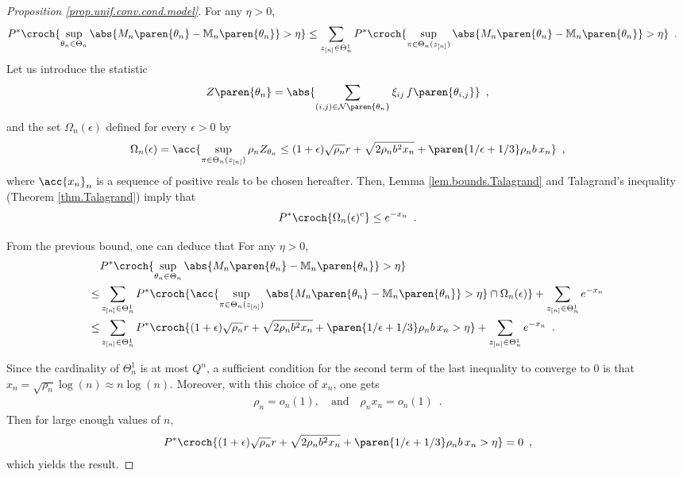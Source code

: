 \documentclass[11pt]{article}
\newtheorem{proof}{Proof}%
\newcommand{\zn}{z_{[n]}}
\begin{document}
\begin{proof}[Proposition \ref{prop.unif.conv.cond.model}]
For any $\eta>0$,
\begin{align*}           P^*\croch{\sup_{\theta_n\in\Theta_n}\abs{M_n\paren{\theta_n}-\mathbb{M}_n\paren{\theta_n}}>\eta} &  \leq \sum_{\zn\in\Theta_n^1} P^*\croch{\sup_{\pi\in\Theta_n(\zn)}\abs{M_n\paren{\theta_n}-\mathbb{M}_n\paren{\theta_n}}>\eta} \enspace.
\end{align*}
%
Let us introduce the statistic
\begin{align*}
Z\paren{\theta_n}=\abs{\sum_{(i, j)\in\mathcal{N}\paren{\theta_n}} \xi_{ij}\, f\paren{\theta_{i,j}}}\enspace,   
\end{align*}
and the set $\Omega_n(\epsilon)$ defined for every $\epsilon>0$ by
\begin{align*}
\Omega_n(\epsilon) = \acc{ \sup_{\pi\in\Theta_n(\zn)} \rho_n Z_{\theta_n} \leq (1+\epsilon) \sqrt{\rho_n} r + \sqrt{2 \rho_n b^2 x_n}+ \paren{1/\epsilon+1/3} \rho_n b\, x_n}\enspace,
\end{align*}
where $\acc{x_n}_n$ is a sequence of positive reals to be chosen hereafter.
%
Then, Lemma \ref{lem.bounds.Talagrand} and Talagrand's inequality (Theorem \ref{thm.Talagrand}) imply that
\begin{align*}
        P^*\croch{\Omega_n(\epsilon)^c}\leq e^{-x_n}\enspace.
\end{align*}

From the previous bound, one can deduce that
For any $\eta>0$,
\begin{align*}           & P^*\croch{\sup_{\theta_n\in\Theta_n}\abs{M_n\paren{\theta_n}-\mathbb{M}_n\paren{\theta_n}}>\eta}\\
\leq & \sum_{\zn\in\Theta_n^1} P^*\croch{\acc{\sup_{\pi\in\Theta_n(\zn)}\abs{M_n\paren{\theta_n}-\mathbb{M}_n\paren{\theta_n}}>\eta} \cap \Omega_n(\epsilon)} +  \sum_{\zn\in\Theta_n^1}  e^{-x_n} \\
\leq & \sum_{\zn\in\Theta_n^1} P^*\croch{ (1+\epsilon) \sqrt{\rho_n} r + \sqrt{2 \rho_n b^2 x_n}+ \paren{1/\epsilon+1/3} \rho_n b\, x_n>\eta} +  \sum_{\zn\in\Theta_n^1}  e^{-x_n}\enspace.
\end{align*}

Since the cardinality of $\Theta_n^1$ is at most $Q^n$, a sufficient condition for the second term of the last inequality to converge to 0 is that $x_n=\sqrt{\rho_n}\log(n)\approx n\log(n)$.
%
Moreover, with this choice of $x_n$, one gets
\begin{align*}
        \rho_n=o_n(1),\quad \mathrm{and}\quad \rho_n x_n=o_n(1)\enspace.
\end{align*}
Then for large enough values of $n$,
\begin{align*}
        P^*\croch{ (1+\epsilon) \sqrt{\rho_n} r + \sqrt{2 \rho_n b^2 x_n}+ \paren{1/\epsilon+1/3} \rho_n b\, x_n>\eta} = 0\enspace,
\end{align*}
which yields the result.

\end{proof}
\end{document}
